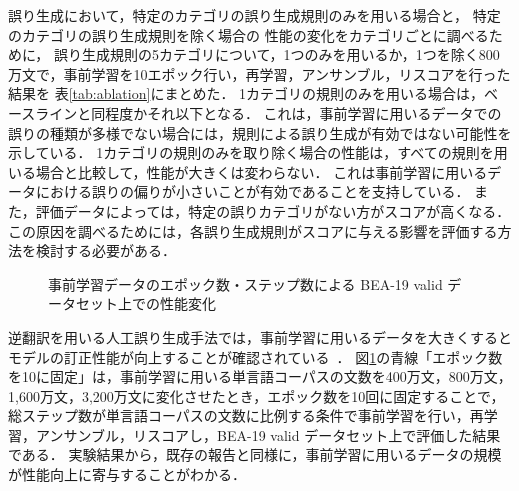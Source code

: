 \documentclass[
  platex, dvipdfmx %
]{nlp2021}
\begin{document}
誤り生成において，特定のカテゴリの誤り生成規則のみを用いる場合と，
特定のカテゴリの誤り生成規則を除く場合の
性能の変化をカテゴリごとに調べるために，
誤り生成規則の5カテゴリについて，1つのみを用いるか，1つを除く800万文で，事前学習を10エポック行い，再学習，アンサンブル，リスコアを行った結果を
表\ref{tab:ablation}にまとめた．
1カテゴリの規則のみを用いる場合は，ベースラインと同程度かそれ以下となる．
これは，事前学習に用いるデータでの誤りの種類が多様でない場合には，規則による誤り生成が有効ではない可能性を示している．
1カテゴリの規則のみを取り除く場合の性能は，すべての規則を用いる場合と比較して，性能が大きくは変わらない．
これは事前学習に用いるデータにおける誤りの偏りが小さいことが有効であることを支持している．
また，評価データによっては，特定の誤りカテゴリがない方がスコアが高くなる．
この原因を調べるためには，各誤り生成規則がスコアに与える影響を評価する方法を検討する必要がある．

\begin{figure}[t]
	\centering
	\small
	\caption{事前学習データのエポック数・ステップ数による BEA-19 valid データセット上での性能変化}
	\label{fig:steps1}
\end{figure}

逆翻訳を用いる人工誤り生成手法では，事前学習に用いるデータを大きくすると
モデルの訂正性能が向上することが確認されている~\cite{kiyono-etal-2019-empirical}．
図\ref{fig:steps1}の青線「エポック数を10に固定」は，事前学習に用いる単言語コーパスの文数を400万文，800万文，1,600万文，3,200万文に変化させたとき，エポック数を10回に固定することで，総ステップ数が単言語コーパスの文数に比例する条件で事前学習を行い，再学習，アンサンブル，リスコアし，BEA-19 valid データセット上で評価した結果である．
実験結果から，既存の報告と同様に，事前学習に用いるデータの規模が性能向上に寄与することがわかる．
\end{document}
